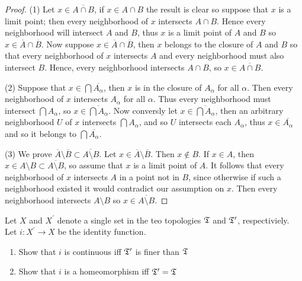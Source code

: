     \begin{proof}
        (1) Let $x \in \overline{A \cap B}$, if $x \in A \cap B$ the result is clear so suppose that $x$ is a limit point; then every neighborhood of $x$ intersects $A \cap B$. 
        Hence every neighborhood will intersect $A$ and $B$, thus $x$ is a limit point of $A$ and $B$ so $x \in \overline{A} \cap \overline{B}$. Now suppose 
        $x \in \overline{A} \cap \overline{B}$, then $x$ belongs to the closure of $A$ and $B$ so that every neighborhood of $x$ intersects $A$ and every neighborhood must also intersect $B$. 
        Hence, every neighborhood intersects $A \cap B$, so $x \in \overline{A \cap B}$. 
        
        (2) Suppose that $x \in \bigcap \overline{A_\alpha}$, then $x$ is in the closure of $A_\alpha$ for all $\alpha$. Then every neighborhood of $x$ intersects $A_\alpha$ for all $\alpha$. 
        Thus every neighborhood must intersect $\bigcap A_\alpha$, so $x \in \overline{\bigcap A_\alpha}$. Now conversly let $x \in \overline{\bigcap A_\alpha}$, then an arbitrary neighborhood $U$
        of $x$ intersects $\bigcap A_\alpha$, and so $U$ intersects each $A_\alpha$, thus $x \in \overline{A_\alpha}$ and so it belongs to $\bigcap \overline{A_\alpha}$. 

        (3) We prove $\overline{A} \setminus \overline{B} \subset \overline{A \setminus B}$. Let $x \in \overline{A} \setminus \overline{B}$. Then $x \notin B$. If $x \in A$, then 
        $x \in A \setminus B \subset \overline{A \setminus B}$, so assume that $x$ is a limit point of $A$. It follows that every neighborhood of $x$ intersects $A$ in a point not in $B$, since otherwise
        if such a neighborhood existed it would contradict our assumption on $x$. Then every neighborhood intersects $A \setminus B$ so $x \in \overline{A \setminus B}$. 
    \end{proof}



    \question 
    Let $X$ and $X^\prime$ denote a single set in the teo topologies $\mathfrak{T}$ and $\mathfrak{T}^\prime$, respectiviely. 
    Let $i: X^\prime \to X$ be the identity function. 
    \begin{enumerate}
        \item Show that $i$ is continuous iff $\mathfrak{T}^\prime$ is finer than $\mathfrak{T}$
        \item Show that $i$ is a homeomorphism iff $\mathfrak{T}^\prime = \mathfrak{T}$
    \end{enumerate}


